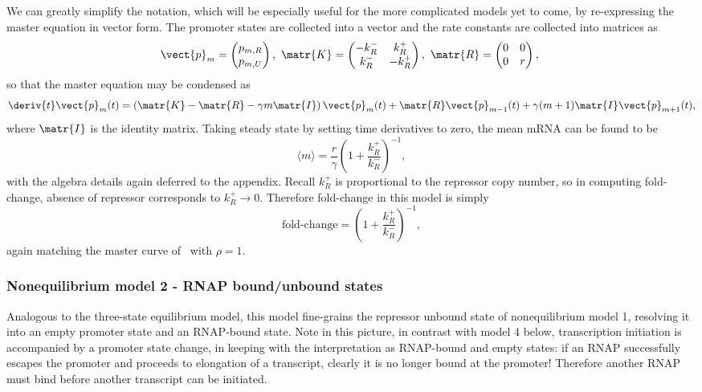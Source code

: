 We can greatly simplify the notation, which will be especially useful for the
more complicated models yet to come, by re-expressing the master equation in
vector form. The promoter states are collected into a vector and the rate
constants are collected into matrices as
\begin{equation}
\vect{p}_m = \begin{pmatrix} p_{m,R} \\ p_{m,U} \end{pmatrix},\
\matr{K} = \begin{pmatrix} -k_R^- & k_R^+ \\ k_R^- & -k_R^+ \end{pmatrix},\
\matr{R} = \begin{pmatrix} 0 & 0 \\ 0 & r \end{pmatrix},\
\label{eq:2state_cme_matrices}
\end{equation}
so that the master equation may be condensed as
\begin{equation}
\deriv{t}\vect{p}_m(t) =
\left( \matr{K} - \matr{R} - \gamma m \matr{I} \right) \vect{p}_m(t)
                + \matr{R} \vect{p}_{m-1}(t)
                + \gamma (m+1) \matr{I} \vect{p}_{m+1}(t),
\label{eq:2state_rep_cme}
\end{equation}
where $\matr{I}$ is the identity matrix. Taking steady state by setting time
derivatives to zero, the mean mRNA can be found to be
\begin{equation}
\langle m \rangle = \frac{r}{\gamma}
        \left(1 + \frac{k_R^+}{k_R^-}\right)^{-1},
\end{equation}
with the algebra details again deferred to the appendix. Recall $k_R^+$ is
proportional to the repressor copy number, so in computing fold-change, absence
of repressor corresponds to $k_R^+\rightarrow0$. Therefore fold-change in this
model is simply
\begin{equation}
\text{fold-change} = \left(1 + \frac{k_R^+}{k_R^-}\right)^{-1},
\end{equation}
again matching the master curve of~ with $\rho=1$.

\subsubsection{Nonequilibrium model 2 - RNAP bound/unbound states}
Analogous to the three-state equilibrium model, this model fine-grains the
repressor unbound state of nonequilibrium model 1, resolving it into an empty
promoter state and an RNAP-bound state. Note in this picture, in contrast with
model 4 below, transcription initiation is accompanied by a promoter state
change, in keeping with the interpretation as RNAP-bound and empty states: if an
RNAP successfully escapes the promoter and proceeds to elongation of a
transcript, clearly it is no longer bound at the promoter! Therefore another
RNAP must bind before another transcript can be initiated.

